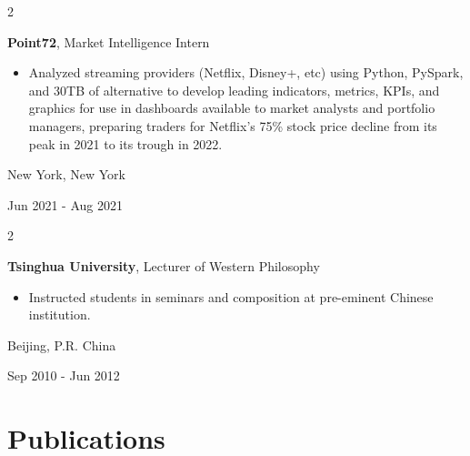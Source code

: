 \documentclass[10pt, letterpaper]{article}
\newenvironment{highlights}{
    \begin{itemize}[
        topsep=0.10 cm,
        parsep=0.10 cm,
        partopsep=0pt,
        itemsep=0pt,
        leftmargin=0.4 cm + 10pt
    ]
}{
    \end{itemize}
} %
\newenvironment{twocolentry}[2][]{
    \onecolentry
    \def\secondColumn{#2}
    \setcolumnwidth{\fill, 4.08 cm}
    \begin{paracol}{2}
}{
    \switchcolumn \raggedleft \secondColumn
    \end{paracol}
    \endonecolentry
} %
\begin{document}
        \vspace{0.2 cm}

        \begin{twocolentry}{
            New York, New York

        Jun 2021 - Aug 2021

        }
            \textbf{Point72}, Market Intelligence Intern
            \begin{highlights}
                \item Analyzed streaming providers (Netflix, Disney+, etc) using Python, PySpark, and 30TB of alternative to develop leading indicators, metrics, KPIs, and graphics for use in dashboards available to market analysts and portfolio managers, preparing traders for Netflix's 75\% stock price decline from its peak in 2021 to its trough in 2022.
            \end{highlights}
        \end{twocolentry}

        \vspace{0.2 cm}




        \begin{twocolentry}{
            Beijing, P.R. China

        Sep 2010 - Jun 2012
        }
            \textbf{Tsinghua University}, Lecturer of Western Philosophy
            \begin{highlights}
                \item Instructed students in seminars and composition at pre-eminent Chinese institution.
            \end{highlights}
        \end{twocolentry}
    \section{Publications}
\end{document}

